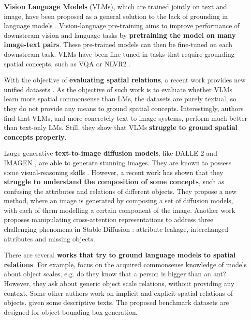 \textbf{Vision Language Models} (VLMs), which are trained jointly on text and image, have been proposed as a general solution to the lack of grounding in language models \cite{lu2019vilbert, tan2020lxmert, ramesh2022hierarchical, saharia2022photorealistic}. Vision-language pre-training aims to improve performance of downstream vision and language tasks by \textbf{pretraining the model on many image-text pairs}. These pre-trained models can then be fine-tuned on each downstream task. VLMs have been fine-tuned in tasks that require grounding spatial concepts, such as VQA \cite{antol2015vqa} or NLVR2 \cite{suhr2018corpus}.

With the objective of \textbf{evaluating spatial relations}, a recent work provides new unified datasets \cite{liu2022things}. As the objective of such work is to evaluate whether VLMs learn more spatial commonsense than LMs, the datasets are purely textual, so they do not provide any means to ground spatial concepts. Interestingly, authors find that VLMs, and more concretely text-to-image systems, perform much better than text-only LMs. Still, they show that VLMs \textbf{struggle to ground spatial concepts properly}.

Large generative \textbf{text-to-image diffusion models}, like DALLE-2 \cite{ramesh2022hierarchical} and IMAGEN \cite{saharia2022photorealistic}, are able to generate stunning images. They are known to possess some visual-reasoning skills \cite{cho2022dall}. However, a recent work \cite{liu2022compositional} has shown that they \textbf{struggle to understand the composition of some concepts}, such as confusing the attributes and relations of different objects. They propose a new method, where an image is generated by composing a set of diffusion models, with each of them modelling a certain component of the image. Another work \cite{anonymous2023trainingfree} proposes manipulating cross-attention representations to address three challenging phenomena in Stable Diffusion \cite{rombach2021highresolution}: attribute leakage, interchanged attributes and missing objects.

There are several \textbf{works that try to ground language models to spatial relations}. For example, \cite{bagherinezhad2016elephants, elazar2019large} focus on the acquired commonsense knowledge of models about object scales, e.g. do they know that a person is bigger than an ant? However, they ask about generic object scale relations, without providing any context. Some other authors \cite{collell2018acquiring, elu2021inferring} work on implicit and explicit spatial relations of objects, given some descriptive texts. The proposed benchmark datasets are designed for object bounding box generation.

